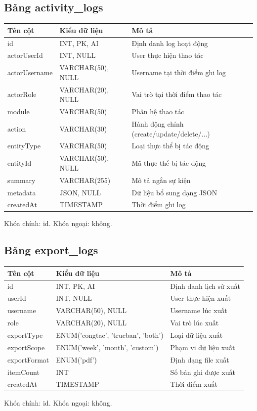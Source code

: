 \documentclass[18pt,a4paper]{report}
\begin{document}
\subsection{Bảng activity\_logs}
\begin{longtable}{|>{\raggedright\arraybackslash}p{4.5cm}|>{\raggedright\arraybackslash}p{4.5cm}|>{\raggedright\arraybackslash}p{6.5cm}|}
\hline
\textbf{Tên cột} & \textbf{Kiểu dữ liệu} & \textbf{Mô tả} \\ \hline
id & INT, PK, AI & Định danh log hoạt động \\ \hline
actorUserId & INT, NULL & User thực hiện thao tác \\ \hline
actorUsername & VARCHAR(50), NULL & Username tại thời điểm ghi log \\ \hline
actorRole & VARCHAR(20), NULL & Vai trò tại thời điểm thao tác \\ \hline
module & VARCHAR(50) & Phân hệ thao tác \\ \hline
action & VARCHAR(30) & Hành động chính (create/update/delete/...) \\ \hline
entityType & VARCHAR(50) & Loại thực thể bị tác động \\ \hline
entityId & VARCHAR(50), NULL & Mã thực thể bị tác động \\ \hline
summary & VARCHAR(255) & Mô tả ngắn sự kiện \\ \hline
metadata & JSON, NULL & Dữ liệu bổ sung dạng JSON \\ \hline
createdAt & TIMESTAMP & Thời điểm ghi log \\ \hline
\end{longtable}
Khóa chính: id. Khóa ngoại: không.

\subsection{Bảng export\_logs}
\begin{longtable}{|>{\raggedright\arraybackslash}p{4.5cm}|>{\raggedright\arraybackslash}p{4.5cm}|>{\raggedright\arraybackslash}p{6.5cm}|}
\hline
\textbf{Tên cột} & \textbf{Kiểu dữ liệu} & \textbf{Mô tả} \\ \hline
id & INT, PK, AI & Định danh lịch sử xuất \\ \hline
userId & INT, NULL & User thực hiện xuất \\ \hline
username & VARCHAR(50), NULL & Username lúc xuất \\ \hline
role & VARCHAR(20), NULL & Vai trò lúc xuất \\ \hline
exportType & ENUM('congtac', 'trucban', 'both') & Loại dữ liệu xuất \\ \hline
exportScope & ENUM('week', 'month', 'custom') & Phạm vi dữ liệu xuất \\ \hline
exportFormat & ENUM('pdf') & Định dạng file xuất \\ \hline
itemCount & INT & Số bản ghi được xuất \\ \hline
createdAt & TIMESTAMP & Thời điểm xuất \\ \hline
\end{longtable}
Khóa chính: id. Khóa ngoại: không.
\end{document}
